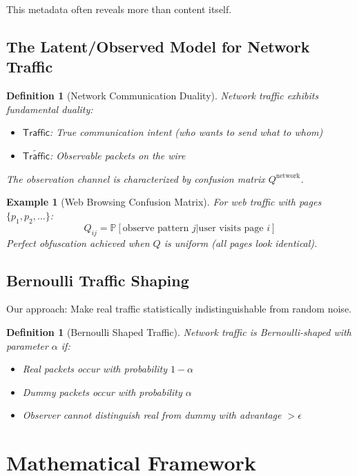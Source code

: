 \documentclass[11pt,final]{article}
\newcommand{\latent}[1]{#1}
\newcommand{\observed}[1]{\tilde{#1}}
\newcommand{\Traffic}{\mathsf{Traffic}}
\newtheorem{definition}[theorem]{Definition}
\newtheorem{example}[theorem]{Example}
\begin{document}
This metadata often reveals more than content itself.

\subsection{The Latent/Observed Model for Network Traffic}

\begin{definition}[Network Communication Duality]
Network traffic exhibits fundamental duality:
\begin{itemize}
    \item $\latent{\Traffic}$: True communication intent (who wants to send what to whom)
    \item $\observed{\Traffic}$: Observable packets on the wire
\end{itemize}
The observation channel is characterized by confusion matrix $Q^{\text{network}}$.
\end{definition}

\begin{example}[Web Browsing Confusion Matrix]
For web traffic with pages $\{p_1, p_2, \ldots\}$:
\begin{equation}
Q_{ij} = \mathbb{P}[\text{observe pattern } j | \text{user visits page } i]
\end{equation}
Perfect obfuscation achieved when $Q$ is uniform (all pages look identical).
\end{example}

\subsection{Bernoulli Traffic Shaping}

Our approach: Make real traffic statistically indistinguishable from random noise.

\begin{definition}[Bernoulli Shaped Traffic]
Network traffic is Bernoulli-shaped with parameter $\alpha$ if:
\begin{itemize}
    \item Real packets occur with probability $1-\alpha$
    \item Dummy packets occur with probability $\alpha$
    \item Observer cannot distinguish real from dummy with advantage $> \epsilon$
\end{itemize}
\end{definition}

\section{Mathematical Framework}
\end{document}
